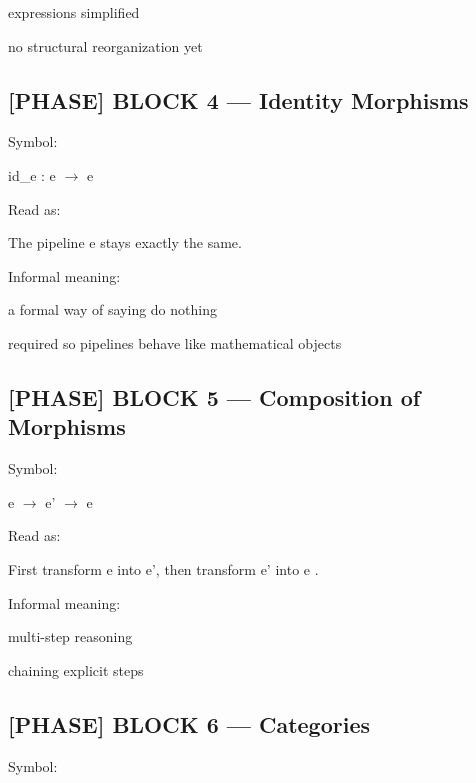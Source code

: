 expressions simplified\par

no structural reorganization yet\par

\subsection*{[PHASE] BLOCK 4 --- Identity Morphisms}

Symbol:\par

id\_e : e $\to$ e\par

Read as:\par

 The pipeline e stays exactly the same. \par

Informal meaning:\par

a formal way of saying do nothing \par

required so pipelines behave like mathematical objects\par

\subsection*{[PHASE] BLOCK 5 --- Composition of Morphisms}

Symbol:\par

e $\to$ e' $\to$ e \par

Read as:\par

 First transform e into e', then transform e' into e . \par

Informal meaning:\par

multi-step reasoning\par

chaining explicit steps\par

\subsection*{[PHASE] BLOCK 6 --- Categories}

Symbol:\par

